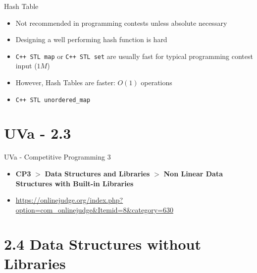 \documentclass{beamer}
\begin{document}
\begin{frame}[fragile]{Hash Table}
    \begin{itemize}
        \item Not recommended in programming contests unless absolute necessary 
        \item Designing a well performing hash function is hard
        \item \verb|C++ STL map| or \verb|C++ STL set| are usually fast for typical programming contest input ($1M$)
        \item However, Hash Tables are faster: $O(1)$ operations
        \item \verb|C++ STL unordered_map|
    \end{itemize}
\end{frame}


\section{UVa - 2.3}
\begin{frame}{UVa - Competitive Programming 3}
    \begin{itemize}
        \item \textbf{CP3} $>$ \textbf{Data Structures and Libraries} $>$ \textbf{Non Linear Data Structures with Built-in Libraries}
        \item \url{https://onlinejudge.org/index.php?option=com_onlinejudge&Itemid=8&category=630}
    \end{itemize}
\end{frame}


\section{2.4 Data Structures without Libraries}

\end{document}
